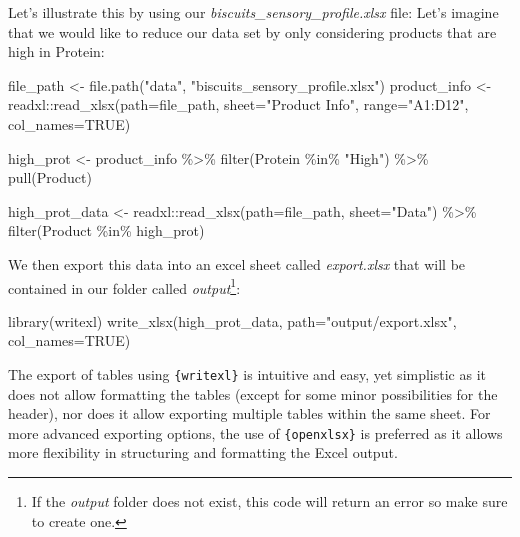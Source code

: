 \documentclass[
]{krantz}
\makeatletter
\newenvironment{Shaded}{\begin{snugshade}}{\end{snugshade}}
\newcommand{\AttributeTok}[1]{\textcolor[rgb]{0.61,0.61,0.61}{#1}}
\newcommand{\ConstantTok}[1]{\textcolor[rgb]{0,0,0}{#1}}
\newcommand{\FunctionTok}[1]{\textcolor[rgb]{0,0,0}{#1}}
\newcommand{\NormalTok}[1]{#1}
\newcommand{\OtherTok}[1]{\textcolor[rgb]{0.37,0.37,0.37}{#1}}
\newcommand{\SpecialCharTok}[1]{\textcolor[rgb]{0,0,0}{#1}}
\newcommand{\StringTok}[1]{\textcolor[rgb]{0.5,0.5,0.5}{#1}}
\newenvironment{kframe}{%
\medskip{}
\setlength{\fboxsep}{.8em}
 \def\at@end@of@kframe{}%
 \ifinner\ifhmode%
  \def\at@end@of@kframe{\end{minipage}}%
  \begin{minipage}{\columnwidth}%
 \fi\fi%
 \def\FrameCommand##1{\hskip\@totalleftmargin \hskip-\fboxsep
 \colorbox{shadecolor}{##1}\hskip-\fboxsep
     \hskip-\linewidth \hskip-\@totalleftmargin \hskip\columnwidth}%
 \MakeFramed {\advance\hsize-\width
   \@totalleftmargin\z@ \linewidth\hsize
   \@setminipage}}%
 {\par\unskip\endMakeFramed%
 \at@end@of@kframe}
\renewenvironment{Shaded}{\begin{kframe}}{\end{kframe}}
\makeatother
\begin{document}
Let's illustrate this by using our \emph{biscuits\_sensory\_profile.xlsx} file: Let's imagine that we would like to reduce our data set by only considering products that are high in Protein:

\begin{Shaded}
\begin{Highlighting}[]
\NormalTok{file\_path }\OtherTok{\textless{}{-}} \FunctionTok{file.path}\NormalTok{(}\StringTok{"data"}\NormalTok{, }\StringTok{"biscuits\_sensory\_profile.xlsx"}\NormalTok{)}
\NormalTok{product\_info }\OtherTok{\textless{}{-}}\NormalTok{ readxl}\SpecialCharTok{::}\FunctionTok{read\_xlsx}\NormalTok{(}\AttributeTok{path=}\NormalTok{file\_path, }\AttributeTok{sheet=}\StringTok{"Product Info"}\NormalTok{, }\AttributeTok{range=}\StringTok{"A1:D12"}\NormalTok{, }\AttributeTok{col\_names=}\ConstantTok{TRUE}\NormalTok{)}

\NormalTok{high\_prot }\OtherTok{\textless{}{-}}\NormalTok{ product\_info }\SpecialCharTok{\%\textgreater{}\%} 
  \FunctionTok{filter}\NormalTok{(Protein }\SpecialCharTok{\%in\%} \StringTok{"High"}\NormalTok{) }\SpecialCharTok{\%\textgreater{}\%} 
  \FunctionTok{pull}\NormalTok{(Product)}

\NormalTok{high\_prot\_data }\OtherTok{\textless{}{-}}\NormalTok{ readxl}\SpecialCharTok{::}\FunctionTok{read\_xlsx}\NormalTok{(}\AttributeTok{path=}\NormalTok{file\_path, }\AttributeTok{sheet=}\StringTok{"Data"}\NormalTok{) }\SpecialCharTok{\%\textgreater{}\%} 
  \FunctionTok{filter}\NormalTok{(Product }\SpecialCharTok{\%in\%}\NormalTok{ high\_prot)}
\end{Highlighting}
\end{Shaded}

We then export this data into an excel sheet called \emph{export.xlsx} that will be contained in our folder called \emph{output}\footnote{If the \emph{output} folder does not exist, this code will return an error so make sure to create one.}:

\begin{Shaded}
\begin{Highlighting}[]
\FunctionTok{library}\NormalTok{(writexl)}
\FunctionTok{write\_xlsx}\NormalTok{(high\_prot\_data, }\AttributeTok{path=}\StringTok{"output/export.xlsx"}\NormalTok{, }\AttributeTok{col\_names=}\ConstantTok{TRUE}\NormalTok{)}
\end{Highlighting}
\end{Shaded}

The export of tables using \texttt{\{writexl\}} is intuitive and easy, yet simplistic as it does not allow formatting the tables (except for some minor possibilities for the header), nor does it allow exporting multiple tables within the same sheet. For more advanced exporting options, the use of \texttt{\{openxlsx\}} is preferred as it allows more flexibility in structuring and formatting the Excel output.
\end{document}
